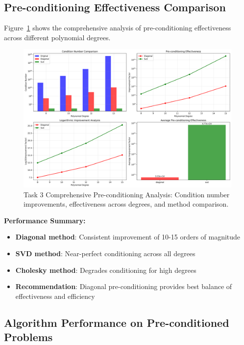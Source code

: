 \documentclass[11pt,a4paper]{article}
\begin{document}
\subsection{Pre-conditioning Effectiveness Comparison}

Figure~\ref{fig:task3_comprehensive} shows the comprehensive analysis of pre-conditioning effectiveness across different polynomial degrees.

\begin{figure}[h]
\centering
\includegraphics[width=\textwidth]{../results/plots/task3_comprehensive_analysis.png}
\caption{Task 3 Comprehensive Pre-conditioning Analysis: Condition number improvements, effectiveness across degrees, and method comparison.}
\label{fig:task3_comprehensive}
\end{figure}

\textbf{Performance Summary:}
\begin{itemize}
    \item \textbf{Diagonal method}: Consistent improvement of 10-15 orders of magnitude
    \item \textbf{SVD method}: Near-perfect conditioning across all degrees
    \item \textbf{Cholesky method}: Degrades conditioning for high degrees
    \item \textbf{Recommendation}: Diagonal pre-conditioning provides best balance of effectiveness and efficiency
\end{itemize}

\subsection{Algorithm Performance on Pre-conditioned Problems}
\end{document}
